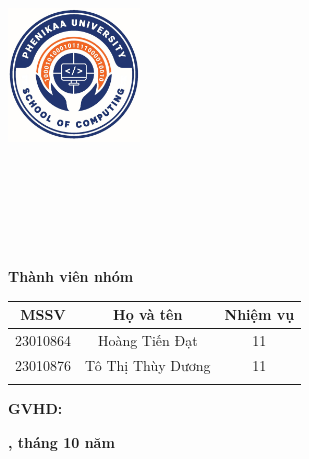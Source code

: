 \begin{titlepage}
  \centering
  \vspace*{-1cm}
  
  {\large\bfseries \TenTruong\\}
  \vspace{0.2cm}
  {\large\bfseries \TenKhoa\\}
  
  \vspace{0.8cm}
  
    {\includegraphics[width=3.5cm]{img/logo.jpg}}%
    {}
  
  \vspace{0.8cm}
  
  {\large\bfseries \TenMon\\}
  \vspace{0.3cm}
  {\normalsize\bfseries \HocPhan\\}
  \vspace{0.3cm}
  {\normalsize \LopNhom\\}
  
  \vspace{0.8cm}
  
  {\Large\bfseries \TenDeTai\\}
  
  \vspace{1.2cm}
  
  {\small
  \textbf{Thành viên nhóm}
  
  \vspace{0.3cm}
  
  \begin{tabular}{|c|c|c|}
    \hline
    \textbf{MSSV} & \textbf{Họ và tên} & \textbf{Nhiệm vụ} \\
    \hline
    23010864 & Hoàng Tiến Đạt & 11 \\
    \hline
    23010876 & Tô Thị Thùy Dương & 11 \\
    \hline
     &  &  \\
    \hline
  \end{tabular}
  }
  
  \vspace{1cm}
  
  {\normalsize \textbf{GVHD: \GVHD}}
  
  \vfill
  
  {\normalsize \textbf{\DiaDiem, tháng 10 năm \Nam}}

\end{titlepage}

